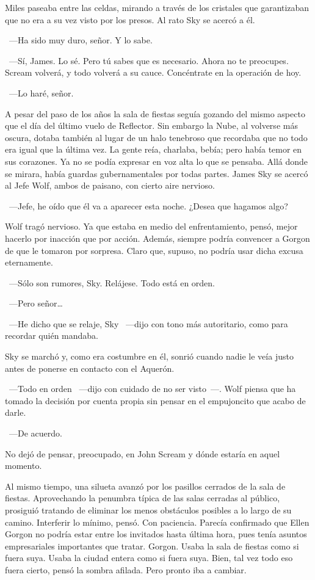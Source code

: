 Miles paseaba entre las celdas, mirando a través de los cristales que garantizaban que no era a su vez visto por los presos. Al rato Sky se acercó a él.

~---Ha sido muy duro, señor. Y lo sabe.

~---Sí, James. Lo sé. Pero tú sabes que es necesario. Ahora no te preocupes. Scream volverá, y todo volverá a su cauce. Concéntrate en la operación de hoy.

~---Lo haré, señor.

\bigskip\noindent
A pesar del paso de los años la sala de fiestas seguía gozando del mismo aspecto que el día del último vuelo de Reflector. Sin embargo la Nube, al volverse más oscura, dotaba también al lugar de un halo tenebroso que recordaba que no todo era igual que la última vez. La gente reía, charlaba, bebía; pero había temor en sus corazones. Ya no se podía expresar en voz alta lo que se pensaba. Allá donde se mirara, había guardas gubernamentales por todas partes. James Sky se acercó al Jefe Wolf, ambos de paisano, con cierto aire nervioso.

~---Jefe, he oído que él va a aparecer esta noche. ¿Desea que hagamos algo?

Wolf tragó nervioso. Ya que estaba en medio del enfrentamiento, pensó, mejor hacerlo por inacción que por acción. Además, siempre podría convencer a Gorgon de que le tomaron por sorpresa. Claro que, supuso, no podría usar dicha excusa eternamente.

~---Sólo son rumores, Sky. Relájese. Todo está en orden.

~---Pero señor\dots

~---He dicho que se relaje, Sky ~---dijo con tono más autoritario, como para recordar quién mandaba.

Sky se marchó y, como era costumbre en él, sonrió cuando nadie le veía justo antes de ponerse en contacto con el Aquerón.

~---Todo en orden ~---dijo con cuidado de no ser visto~---. Wolf piensa que ha tomado la decisión por cuenta propia sin pensar en el empujoncito que acabo de darle.

~---De acuerdo.

No dejó de pensar, preocupado, en John Scream y dónde estaría en aquel momento.

Al mismo tiempo, una silueta avanzó por los pasillos cerrados de la sala de fiestas. Aprovechando la penumbra típica de las salas cerradas al público, prosiguió tratando de eliminar los menos obstáculos posibles a lo largo de su camino. Interferir lo mínimo, pensó. Con paciencia. Parecía confirmado que Ellen Gorgon no podría estar entre los invitados hasta última hora, pues tenía asuntos empresariales importantes que tratar. Gorgon. Usaba la sala de fiestas como si fuera suya. Usaba la ciudad entera como si fuera suya. Bien, tal vez todo eso fuera cierto, pensó la sombra afilada. Pero pronto iba a cambiar.

